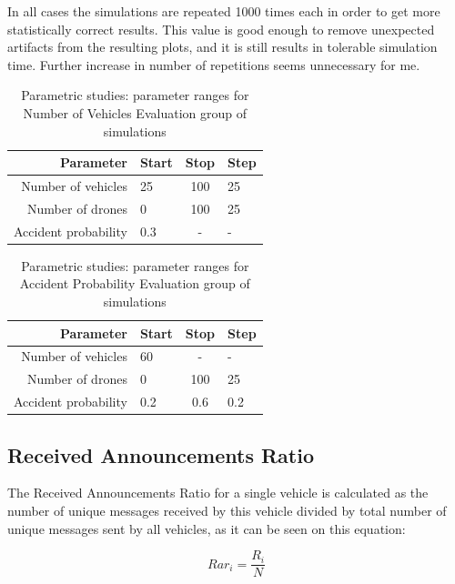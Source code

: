 \documentclass[]{nsm-thesis}
\begin{document}
In all cases the simulations are repeated 1000 times each in order to get more statistically correct results. This value is good enough to remove unexpected artifacts from the resulting plots, and it is still results in tolerable simulation time. Further increase in number of repetitions seems unnecessary for me.

\begin{table}
    \centering
    \begin{tabular}{rlcl}
        \toprule
        Parameter & Start & Stop & Step \\
        \midrule
		Number of vehicles & 25 & 100 & 25 \\
		Number of drones & 0 & 100 & 25 \\
		Accident probability & 0.3 & - & - \\
        \bottomrule
    \end{tabular}
    \caption{Parametric studies: parameter ranges for Number of Vehicles Evaluation group of simulations}
    \label{tab:inputrange1}
\end{table}

\begin{table}
    \centering
    \begin{tabular}{rlcl}
        \toprule
        Parameter & Start & Stop & Step \\
        \midrule
		Number of vehicles & 60 & - & - \\
		Number of drones & 0 & 100 & 25 \\
		Accident probability & 0.2 & 0.6 & 0.2 \\
        \bottomrule
    \end{tabular}
    \caption{Parametric studies: parameter ranges for Accident Probability Evaluation group of simulations}
    \label{tab:inputrange2}
\end{table}



\subsection{Received Announcements Ratio}
\label{sec:ReceivedAnnouncementsRatio}

The Received Announcements Ratio for a single vehicle is calculated as the number of unique messages received by this vehicle divided by total number of unique messages sent by all vehicles, as it can be seen on this equation:

\begin{equation}\label{eq:ra-ratio}
Rar_{i} = \frac{R_{i}}{N}
\end{equation}
\end{document}
